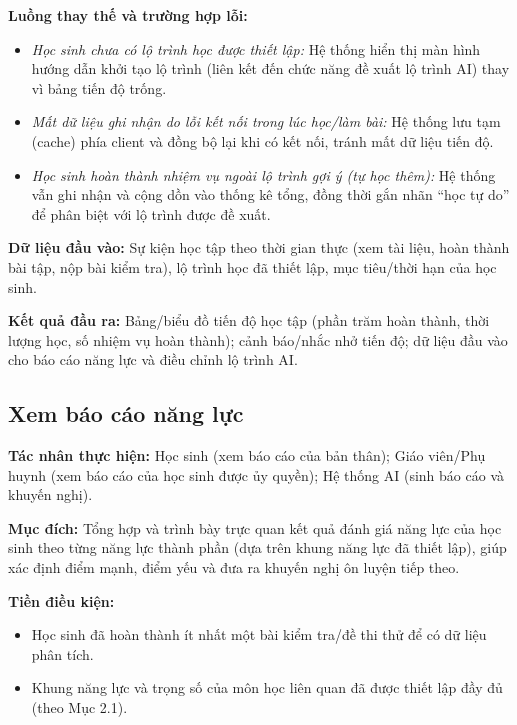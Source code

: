 \documentclass[12pt,a4paper]{article}
\newcommand{\ucfield}[2]{\noindent\textbf{#1: } #2\par\vspace{0.35em}}
\begin{document}
	\ucfield{Luồng thay thế và trường hợp lỗi}{
		\begin{itemize}[nosep]
			\item \textit{Học sinh chưa có lộ trình học được thiết lập:} Hệ thống hiển thị màn hình hướng dẫn khởi tạo lộ trình (liên kết đến chức năng đề xuất lộ trình AI) thay vì bảng tiến độ trống.
			\item \textit{Mất dữ liệu ghi nhận do lỗi kết nối trong lúc học/làm bài:} Hệ thống lưu tạm (cache) phía client và đồng bộ lại khi có kết nối, tránh mất dữ liệu tiến độ.
			\item \textit{Học sinh hoàn thành nhiệm vụ ngoài lộ trình gợi ý (tự học thêm):} Hệ thống vẫn ghi nhận và cộng dồn vào thống kê tổng, đồng thời gắn nhãn ``học tự do'' để phân biệt với lộ trình được đề xuất.
	\end{itemize}}
	
	\ucfield{Dữ liệu đầu vào}{Sự kiện học tập theo thời gian thực (xem tài liệu, hoàn thành bài tập, nộp bài kiểm tra), lộ trình học đã thiết lập, mục tiêu/thời hạn của học sinh.}
	
	\ucfield{Kết quả đầu ra}{Bảng/biểu đồ tiến độ học tập (phần trăm hoàn thành, thời lượng học, số nhiệm vụ hoàn thành); cảnh báo/nhắc nhở tiến độ; dữ liệu đầu vào cho báo cáo năng lực và điều chỉnh lộ trình AI.}
	
	\subsection{Xem báo cáo năng lực}
	
	\ucfield{Tác nhân thực hiện}{Học sinh (xem báo cáo của bản thân); Giáo viên/Phụ huynh (xem báo cáo của học sinh được ủy quyền); Hệ thống AI (sinh báo cáo và khuyến nghị).}
	
	\ucfield{Mục đích}{Tổng hợp và trình bày trực quan kết quả đánh giá năng lực của học sinh theo từng năng lực thành phần (dựa trên khung năng lực đã thiết lập), giúp xác định điểm mạnh, điểm yếu và đưa ra khuyến nghị ôn luyện tiếp theo.}
	
	\ucfield{Tiền điều kiện}{
		\begin{itemize}[nosep]
			\item Học sinh đã hoàn thành ít nhất một bài kiểm tra/đề thi thử để có dữ liệu phân tích.
			\item Khung năng lực và trọng số của môn học liên quan đã được thiết lập đầy đủ (theo Mục 2.1).
	\end{itemize}}
	
\end{document}
